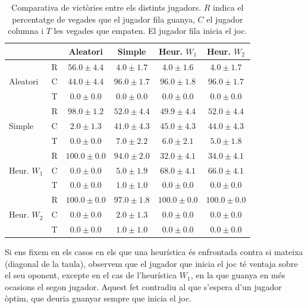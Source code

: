 \documentclass[12pt,a4paper]{article}
\begin{document}
\begin{table}[h]
\centering
\begin{tabular}{|l|l|c|c|c|c|}
\hline
\multicolumn{2}{|c|}{} & Aleatori & Simple & Heur. $W_1$ & Heur. $W_2$\\
\hline
\multirow{3}{*}{Aleatori} & R & $56.0 \pm 4.4$ & $4.0 \pm 1.7$ & $4.0 \pm 1.6$  & $4.0 \pm 1.7$   \\
& C & $44.0 \pm 4.4$ & $96.0 \pm 1.7$ & $96.0 \pm 1.8$ & $96.0 \pm 1.7$\\
& T & $0.0 \pm 0.0$ & $0.0 \pm 0.0$ & $0.0 \pm 0.0$ & $0.0 \pm 0.0$ \\
\hline
\multirow{3}{*}{Simple} & R & $98.0 \pm 1.2$ & $52.0 \pm 4.4$ & $49.9 \pm 4.4$ & $52.0 \pm 4.4$\\
& C & $2.0 \pm 1.3$ & $41.0 \pm 4.3$ & $45.0 \pm 4.3$ & $44.0 \pm 4.3$\\
& T & $0.0 \pm 0.0$ & $7.0 \pm 2.2$ & $6.0 \pm 2.1$ & $5.0 \pm 1.8$\\
\hline
\multirow{3}{*}{Heur. $W_1$} & R & $100.0 \pm 0.0$ & $94.0 \pm 2.0$ & $32.0 \pm 4.1$ & $34.0 \pm 4.1$\\
& C & $0.0 \pm 0.0$ & $5.0 \pm 1.9$ & $68.0 \pm 4.1$ & $66.0 \pm 4.1$ \\
& T & $0.0 \pm 0.0$ & $1.0 \pm 1.0$ & $0.0 \pm 0.0$ & $0.0 \pm 0.0$ \\
\hline
\multirow{3}{*}{Heur. $W_2$} & R & $100.0 \pm 0.0$ & $97.0 \pm 1.8$ & $100.0 \pm 0.0$ & $100.0 \pm 0.0$ \\
& C & $0.0 \pm 0.0$ & $2.0 \pm 1.3$ & $0.0 \pm 0.0$ & $0.0 \pm 0.0$\\
& T & $0.0 \pm 0.0$ & $1.0 \pm 1.0$ & $0.0 \pm 0.0$ & $0.0 \pm 0.0$\\
\hline
\end{tabular}
\caption{Comparativa de victòries entre els distints jugadors. $R$ indica el percentatge de vegades que el jugador fila guanya, $C$ el jugador columna i $T$ les vegades que empaten. El jugador fila inicia el joc.}
\label{tab:expr_best_heur}
\end{table}

Si ens fixem en els casos en els que una heurística és enfrontada contra si mateixa (diagonal de la taula), observem que el jugador que inicia el joc té ventaja sobre el seu oponent, excepte en el cas de l'heurística $W_1$, en la que guanya en més ocasions el segon jugador. Aquest fet contradiu al que s'espera d'un jugador òptim, que deuria guanyar sempre que inicia el joc\cite{allis1988knowledge}.\\
\end{document}
